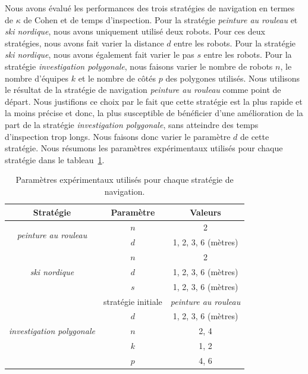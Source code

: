 \documentclass[francais,RandD]{rapportPFE}
\begin{document}
		Nous avons évalué les performances des trois stratégies de navigation en termes de $\kappa$ de Cohen et de temps d'inspection.
		Pour la stratégie \textit{peinture au rouleau} et \textit{ski nordique}, nous avons uniquement utilisé deux robots.
		Pour ces deux stratégies, nous avons fait varier la distance $d$ entre les robots.
		Pour la stratégie \textit{ski nordique}, nous avons également fait varier le pas $s$ entre les robots.
		Pour la stratégie \textit{investigation polygonale}, nous faisons varier le nombre de robots $n$, le nombre d'équipes $k$ et le nombre de côtés $p$ des polygones utilisés.
		Nous utilisons le résultat de la stratégie de navigation \textit{peinture au rouleau} comme point de départ.
		Nous justifions ce choix par le fait que cette stratégie est la plus rapide et la moins précise et donc, la plus susceptible de bénéficier d'une amélioration de la part de la stratégie \textit{investigation polygonale}, sans atteindre des temps d'inspection trop longs.
		Nous faisons donc varier le paramètre $d$ de cette stratégie.
		Nous résumons les paramètres expérimentaux utilisés pour chaque stratégie dans le tableau~\ref{tab:exp_params}.

		\begin{table}[h!]
			\centering
			\begin{tabular}{|c|c|c|}
				\hline
				Stratégie & Paramètre & Valeurs \\
				\hline
				\multirow{2}{*}{\textit{peinture au rouleau}} & $n$ & 2 \\
				& $d$ & 1, 2, 3, 6 (mètres) \\
				\hline
				\multirow{3}{*}{\textit{ski nordique}} & $n$ & 2 \\
				& $d$ & 1, 2, 3, 6 (mètres) \\
				& $s$ & 1, 2, 3, 6 (mètres) \\
				\hline
				\multirow{5}{*}{\textit{investigation polygonale}} & stratégie initiale & \textit{peinture au rouleau} \\
				& $d$ & 1, 2, 3, 6 (mètres) \\
				& $n$ & 2, 4 \\
				& $k$ & 1, 2 \\
				& $p$ & 4, 6 \\
				\hline
			\end{tabular}
			\caption{Paramètres expérimentaux utilisés pour chaque stratégie de navigation.}
			\label{tab:exp_params}
		\end{table}
\end{document}
